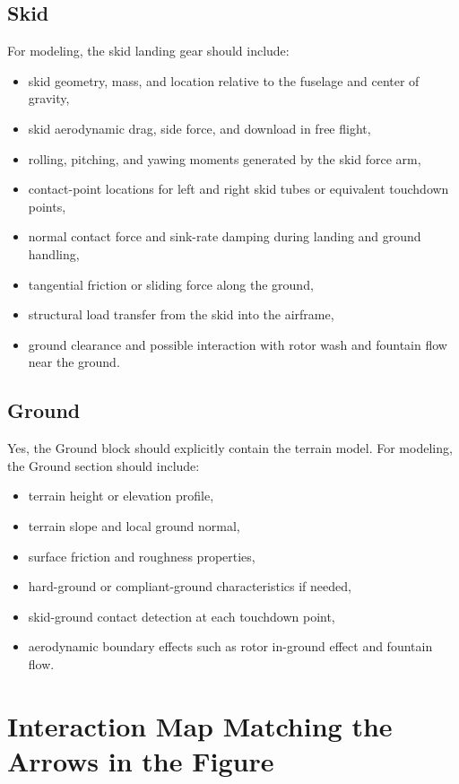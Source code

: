 \documentclass[12pt,a4paper]{article}
\begin{document}
\subsection{Skid}

For modeling, the skid landing gear should include:
\begin{itemize}
  \item skid geometry, mass, and location relative to the fuselage and center of gravity,
  \item skid aerodynamic drag, side force, and download in free flight,
  \item rolling, pitching, and yawing moments generated by the skid force arm,
  \item contact-point locations for left and right skid tubes or equivalent touchdown points,
  \item normal contact force and sink-rate damping during landing and ground handling,
  \item tangential friction or sliding force along the ground,
  \item structural load transfer from the skid into the airframe,
  \item ground clearance and possible interaction with rotor wash and fountain flow near the ground.
\end{itemize}

\subsection{Ground}

Yes, the Ground block should explicitly contain the terrain model. For modeling,
the Ground section should include:
\begin{itemize}
  \item terrain height or elevation profile,
  \item terrain slope and local ground normal,
  \item surface friction and roughness properties,
  \item hard-ground or compliant-ground characteristics if needed,
  \item skid-ground contact detection at each touchdown point,
  \item aerodynamic boundary effects such as rotor in-ground effect and fountain flow.
\end{itemize}

\section{Interaction Map Matching the Arrows in the Figure}
\end{document}
